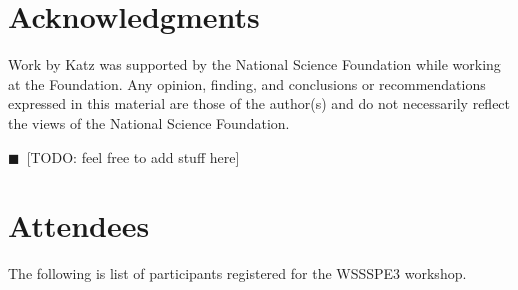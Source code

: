 \documentclass[11pt, oneside]{amsart}
\newcommand{\todo}[1]{{\color{blue}$\blacksquare$~\textsf{[TODO: #1]}}}
\begin{document}
\section*{Acknowledgments} \label{sec:acks}

Work by Katz was supported by the National Science Foundation while working at
the Foundation. Any opinion, finding, and conclusions or recommendations
expressed in this material are those of the author(s) and do not necessarily
reflect the views of the National Science Foundation.

\todo{feel free to add stuff here}


\appendix
\section{Attendees}  \label{sec:attendees}
The following is list of participants registered for the WSSSPE3 workshop.

{\scriptsize
\begin{longtable}{lll}

\end{longtable}
}
















\end{document}
